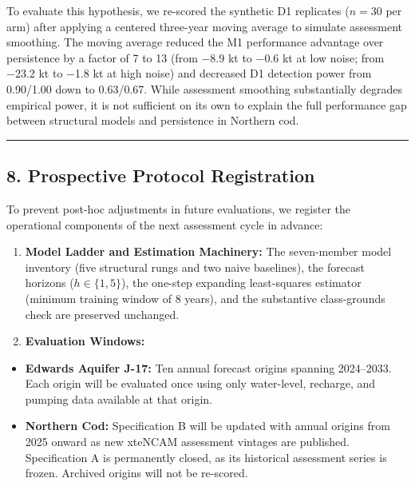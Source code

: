 \documentclass[11pt]{article}
\providecommand{\tightlist}{\setlength{\itemsep}{0.2em}\setlength{\parskip}{0pt}}
\begin{document}
To evaluate this hypothesis, we re-scored the synthetic D1 replicates
(\(n = 30\) per arm) after applying a centered three-year moving average
to simulate assessment smoothing. The moving average reduced the M1
performance advantage over persistence by a factor of 7 to 13 (from −8.9
kt to −0.6 kt at low noise; from −23.2 kt to −1.8 kt at high noise) and
decreased D1 detection power from 0.90/1.00 down to 0.63/0.67. While
assessment smoothing substantially degrades empirical power, it is not
sufficient on its own to explain the full performance gap between
structural models and persistence in Northern cod.

\begin{center}\rule{0.5\linewidth}{0.5pt}\end{center}

\subsection{8. Prospective Protocol
Registration}\label{prospective-protocol-registration}

To prevent post-hoc adjustments in future evaluations, we register the
operational components of the next assessment cycle in advance:

\begin{enumerate}
\def\labelenumi{\arabic{enumi}.}
\tightlist
\item
  \textbf{Model Ladder and Estimation Machinery:} The seven-member model
  inventory (five structural rungs and two naive baselines), the
  forecast horizons (\(h \in \{1, 5\}\)), the one-step expanding
  least-squares estimator (minimum training window of 8 years), and the
  substantive class-grounds check are preserved unchanged.
\item
  \textbf{Evaluation Windows:}
\end{enumerate}

\begin{itemize}
\tightlist
\item
  \textbf{Edwards Aquifer J-17:} Ten annual forecast origins spanning
  2024--2033. Each origin will be evaluated once using only water-level,
  recharge, and pumping data available at that origin.
\item
  \textbf{Northern Cod:} Specification B will be updated with annual
  origins from 2025 onward as new xteNCAM assessment vintages are
  published. Specification A is permanently closed, as its historical
  assessment series is frozen. Archived origins will not be re-scored.
\end{itemize}
\end{document}
